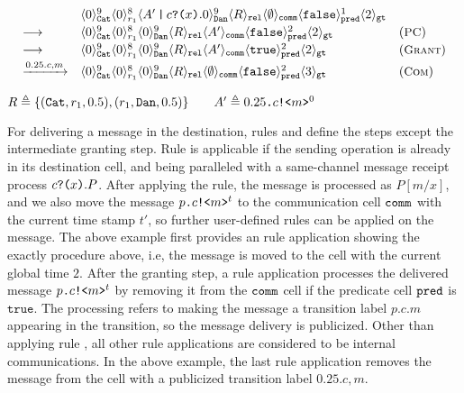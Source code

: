 {\footnotesize
\[
\begin{array}{lll}
&\langle 0 \rangle^{9}_{\texttt{Cat}}\langle 0 \rangle^{8}_{r_1}
\langle A'\,\texttt{|}\,c\texttt{?(}x\texttt{)}.0 \rangle^{9}_{\texttt{Dan}} 
\langle R \rangle_{\texttt{rel}}
\langle \emptyset \rangle_{\texttt{comm}}
\langle \texttt{false} \rangle^{1}_{\texttt{pred}}
\langle 2 \rangle_{\texttt{gt}}
\\[0.2em]
\longrightarrow
&
\langle 0 \rangle^{9}_{\texttt{Cat}}\langle 0 \rangle^{8}_{r_1}
\langle 0 \rangle^{9}_{\texttt{Dan}} 
\langle R \rangle_{\texttt{rel}}
\langle A' \rangle_{\texttt{comm}}
\langle \texttt{false} \rangle^{2}_{\texttt{pred}}
\langle 2 \rangle_{\texttt{gt}}
&
({\small \textsc{PC}})
\\[0.2em]
\longrightarrow
&
\langle 0 \rangle^{9}_{\texttt{Cat}}\langle 0 \rangle^{8}_{r_1}
\langle 0 \rangle^{9}_{\texttt{Dan}} 
\langle R \rangle_{\texttt{rel}}
\langle A' \rangle_{\texttt{comm}}
\langle \texttt{true} \rangle^{2}_{\texttt{pred}}
\langle 2 \rangle_{\texttt{gt}}
&
({\small \textsc{Grant}})
\\[0.2em]
\xrightarrow{0.25.c,m}
&
\langle 0 \rangle^{9}_{\texttt{Cat}}\langle 0 \rangle^{8}_{r_1}
\langle 0 \rangle^{9}_{\texttt{Dan}} 
\langle R \rangle_{\texttt{rel}}
\langle \emptyset \rangle_{\texttt{comm}}
\langle \texttt{false} \rangle^{2}_{\texttt{pred}}
\langle 3 \rangle_{\texttt{gt}}
&
({\small \textsc{Com}})
\end{array}
\]
}
{\footnotesize
\begin{center}
$R\triangleq\{(\texttt{Cat},r_1,0.5), (r_1,\texttt{Dan},0.5)\}
\qquad
A'\triangleq0.25\texttt{.}c\texttt{!<}m\texttt{>}^0$
\end{center}
}

For delivering a message in the destination,
rules  and  define the steps except the intermediate granting step.
Rule  is applicable if the sending operation is already in its destination cell, and being paralleled with a same-channel message receipt process $c\texttt{?(}x\texttt{)}.P$. After applying the rule, the message is processed as $P[m/x]$, and we also move the message $p\texttt{.}c\texttt{!<}m\texttt{>}^t$ to the communication cell $\texttt{comm}$ with the current time stamp $t'$, so further user-defined rules can be applied on the message.
The above example first provides an  rule application showing the exactly procedure above, i.e, the message is moved to the  cell with the current global time $2$.
After the granting step,
a  rule application processes the delivered message $p\texttt{.}c\texttt{!<}m\texttt{>}^t$ by removing it from the $\texttt{comm}$ cell if the predicate cell $\texttt{pred}$ is $\texttt{true}$. The processing refers to making the message a transition label $p.c.m$ appearing in the transition,
so the message delivery is publicized. Other than applying rule , all other rule applications are considered to be internal communications. 
In the above example, the last  rule application removes the message from the cell with a publicized transition label $0.25.c,m$. 

